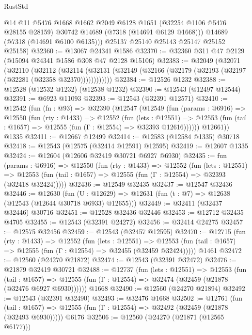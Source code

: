 \begin{lexlean}{RustStd}
\begin{coremodule}
          @14
          @11
          @5476
          @1668
          @1662
          @2049
          @6128
          @1651
          (@32254 @1106 @5476 @28155 @28159)
          @30742
          @14689
          (@7318 (@14691 @6129 @1668)))
        @14689
        (@7318 (@14691 @6100 @6135)))
      @25137
      @25140
      @25143
      @25147
      @25152
      @25158)
@32360 := @13067 @24341 @1586
@32370 := @32360 @311 @47 @2129 (@15094 @24341 @1586 @308 @47 @2128 @15106)
@32383 := @32049
    (@32071
      (@32110
        (@32112
          (@32114 (@32131 (@32149 (@32166 (@32179 (@32193 (@32197 (@32281 (@32358 @32370))))))))))))
@32384 := @12526 @1232
@32388 := @12528 (@12532 @1232) (@12538 @1232)
@32390 := @12543 (@12497 @12544)
@32391 := @6923 @11093
@32393 := @12543 (@32391 @12571)
@32410 := @12542
    (fun (fn : @93) =>
    @32390
      (@12547
        (@12549
          (fun (params : @6916) =>
          @12550
            (fun (rty : @1433) =>
            @12552
              (fun (lets : @12551) =>
              @12553 (fun (tail : @1657) => @12555 (fun (Γ : @12554) => @32393 @12616))))))
        @12661))
    @1335
@32411 := @12667 @12499
@32414 := @12583 (@12584 @1335) @30718
@32418 := @12543 (@12575 (@32414 @12591) @12595)
@32419 := @12607 @1335
@32424 := @12604 (@12606 @32419 @30721 @6927 @6930)
@32435 := fun (params : @6916) =>
  @12550
    (fun (rty : @1433) =>
    @12552
      (fun (lets : @12551) =>
      @12553 (fun (tail : @1657) => @12555 (fun (Γ : @12554) => @32393 (@32418 @32424)))))
@32436 := @12549 @32435
@32437 := @12547 @32436
@32446 := @12630
    (fun (U : @12629) => @12631 (fun (t : @7) => @12638 (@12543 (@12644 @30718 @6933) @12655)))
@32449 := @32411 (@32437 @32446) @30716
@32451 := @12528 @32436 @32446
@32453 := @12712 @32435 @4705
@32455 := @12543 (@32391 @24272)
@32456 := @32414 @24275
@32457 := @12575 @32456
@32459 := @12543 (@32457 @12595)
@32470 := @12715
    (fun (rty : @1433) =>
    @12552
      (fun (lets : @12551) =>
      @12553 (fun (tail : @1657) => @12555 (fun (Γ : @12554) => @32455 (@32459 @32424)))))
    @1461
@32472 := @12560 (@24270 @21872)
@32474 := @12543 (@32391 @32472)
@32476 := @21879 @32419 @30721
@32488 := @12737
    (fun (lets : @12551) =>
    @12553
      (fun (tail : @1657) =>
      @12555 (fun (Γ : @12554) => @32474 (@32459 (@21878 (@32476 @6927 @6930))))))
    @1668
@32490 := @12560 (@24270 @21894)
@32492 := @12543 (@32391 @32490)
@32493 := @32476 @1668
@32502 := @12761
    (fun (tail : @1657) => @12555 (fun (Γ : @12554) => @32492 (@32459 (@21878 (@32493 @6930)))))
    @6176
@32506 := @12560 (@24270 (@21871 (@12565 @6177)))

\end{coremodule}
\end{lexlean}
